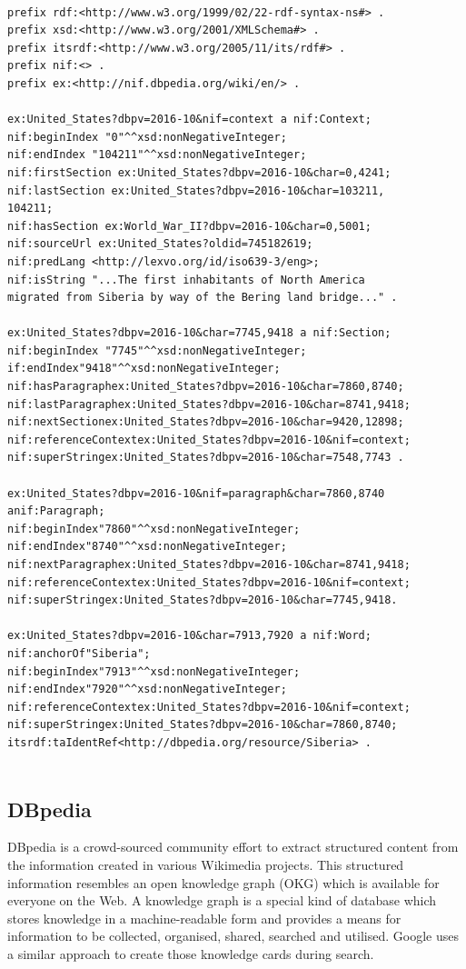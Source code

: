 \documentclass[thesis=M,english]{FITthesis}[2018/05/30]
\begin{document}
\begin{lstlisting}[basicstyle=\small,caption={{Example of NIF taken from \protect\footnotemark \label{NIF Example}}},captionpos=b]

prefix rdf:<http://www.w3.org/1999/02/22-rdf-syntax-ns#> .
prefix xsd:<http://www.w3.org/2001/XMLSchema#> .
prefix itsrdf:<http://www.w3.org/2005/11/its/rdf#> .
prefix nif:<> .
prefix ex:<http://nif.dbpedia.org/wiki/en/> .

ex:United_States?dbpv=2016-10&nif=context a nif:Context;
nif:beginIndex "0"^^xsd:nonNegativeInteger;
nif:endIndex "104211"^^xsd:nonNegativeInteger;
nif:firstSection ex:United_States?dbpv=2016-10&char=0,4241;
nif:lastSection ex:United_States?dbpv=2016-10&char=103211,
104211;
nif:hasSection ex:World_War_II?dbpv=2016-10&char=0,5001;
nif:sourceUrl ex:United_States?oldid=745182619;
nif:predLang <http://lexvo.org/id/iso639-3/eng>;
nif:isString "...The first inhabitants of North America 
migrated from Siberia by way of the Bering land bridge..." .

ex:United_States?dbpv=2016-10&char=7745,9418 a nif:Section;
nif:beginIndex "7745"^^xsd:nonNegativeInteger;
if:endIndex"9418"^^xsd:nonNegativeInteger;
nif:hasParagraphex:United_States?dbpv=2016-10&char=7860,8740;
nif:lastParagraphex:United_States?dbpv=2016-10&char=8741,9418;
nif:nextSectionex:United_States?dbpv=2016-10&char=9420,12898;
nif:referenceContextex:United_States?dbpv=2016-10&nif=context;
nif:superStringex:United_States?dbpv=2016-10&char=7548,7743 .

ex:United_States?dbpv=2016-10&nif=paragraph&char=7860,8740
anif:Paragraph;
nif:beginIndex"7860"^^xsd:nonNegativeInteger;
nif:endIndex"8740"^^xsd:nonNegativeInteger;
nif:nextParagraphex:United_States?dbpv=2016-10&char=8741,9418;
nif:referenceContextex:United_States?dbpv=2016-10&nif=context;
nif:superStringex:United_States?dbpv=2016-10&char=7745,9418.

ex:United_States?dbpv=2016-10&char=7913,7920 a nif:Word;
nif:anchorOf"Siberia";
nif:beginIndex"7913"^^xsd:nonNegativeInteger;
nif:endIndex"7920"^^xsd:nonNegativeInteger;
nif:referenceContextex:United_States?dbpv=2016-10&nif=context;
nif:superStringex:United_States?dbpv=2016-10&char=7860,8740;
itsrdf:taIdentRef<http://dbpedia.org/resource/Siberia> .
	
\end{lstlisting}
\subsection{DBpedia}
DBpedia \cite{dbpedia:core} is a crowd-sourced community effort to extract structured content from the information created in various Wikimedia projects. This structured information resembles an open knowledge graph (OKG) which is available for everyone on the Web. A knowledge graph is a special kind of database which stores knowledge in a machine-readable form and provides a means for information to be collected, organised, shared, searched and utilised. Google uses a similar approach to create those knowledge cards during search.
\end{document}
